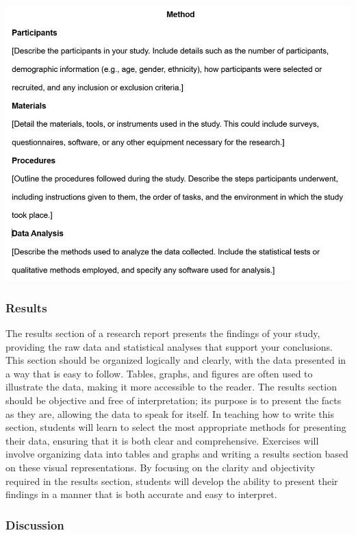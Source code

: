 \documentclass[
]{book}
\begin{document}
\includegraphics[width=1\linewidth,height=\textheight,keepaspectratio]{images/fig083.jpg}

\subsubsection*{Results}\label{results}

The results section of a research report presents the findings of your study, providing the raw data and statistical analyses that support your conclusions. This section should be organized logically and clearly, with the data presented in a way that is easy to follow. Tables, graphs, and figures are often used to illustrate the data, making it more accessible to the reader. The results section should be objective and free of interpretation; its purpose is to present the facts as they are, allowing the data to speak for itself. In teaching how to write this section, students will learn to select the most appropriate methods for presenting their data, ensuring that it is both clear and comprehensive. Exercises will involve organizing data into tables and graphs and writing a results section based on these visual representations. By focusing on the clarity and objectivity required in the results section, students will develop the ability to present their findings in a manner that is both accurate and easy to interpret.

\subsubsection*{Discussion}\label{discussion}
\end{document}
